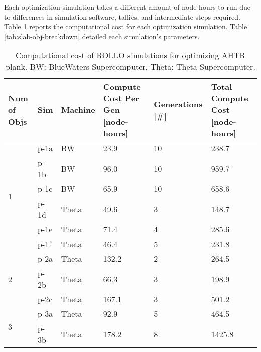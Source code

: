 Each optimization simulation takes a different amount of node-hours to run due to 
differences in simulation software, tallies, and intermediate steps required. 
Table \ref{tab:plank-compute-cost} reports the computational cost for each optimization 
simulation. 
Table \ref{tab:slab-obj-breakdown} detailed each simulation's parameters.
\begin{table}[htbp!]
    \centering
    \onehalfspacing
    \caption{Computational cost of \gls{ROLLO} simulations for optimizing \gls{AHTR}
    plank. BW: BlueWaters Supercomputer, Theta: Theta Supercomputer.}
	\label{tab:plank-compute-cost}
    \footnotesize
    \begin{tabular}{p{1.4cm}|p{1cm}lp{3.5cm}lp{3.5cm}}
    \hline 
    \textbf{Num of Objs} & \textbf{Sim} & \textbf{Machine} & 
    \textbf{Compute Cost Per Gen [node-hours]} &\textbf{Generations [\#]} & 
    \textbf{Total Compute Cost [node-hours]} \\
    \hline
    \multirow{6}{2cm}{1} 
    & p-1a & BW & 23.9 & 10 & 238.7 \\
    & p-1b & BW & 96.0 & 10 & 959.7 \\
    & p-1c & BW & 65.9 & 10 & 658.6 \\
    & p-1d & Theta & 49.6 & 3 & 148.7 \\
    & p-1e & Theta & 71.4 & 4 & 285.6 \\
    & p-1f & Theta & 46.4 & 5 & 231.8 \\
    \hline
    \multirow{3}{2cm}{2}
    & p-2a & Theta & 132.2 & 2 & 264.5 \\
    & p-2b & Theta & 66.3 & 3 & 198.9 \\
    & p-2c & Theta & 167.1 & 3 & 501.2 \\
    \hline
    \multirow{2}{2cm}{3}
    & p-3a & Theta & 92.9 & 5 & 464.5 \\
    & p-3b & Theta & 178.2 & 8 & 1425.8 \\
    \hline
    \end{tabular}
\end{table}
